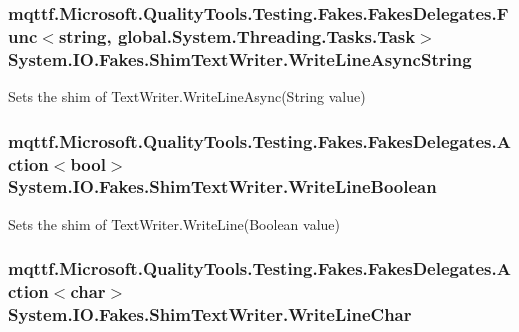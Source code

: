 \hypertarget{class_system_1_1_i_o_1_1_fakes_1_1_shim_text_writer_a182a57b6d52f8efeabd6879ccf35b156}{
\subsubsection[{Write\-Line\-Async\-String}]{\setlength{\rightskip}{0pt plus 5cm}mqttf.\-Microsoft.\-Quality\-Tools.\-Testing.\-Fakes.\-Fakes\-Delegates.\-Func$<$string, global.\-System.\-Threading.\-Tasks.\-Task$>$ System.\-I\-O.\-Fakes.\-Shim\-Text\-Writer.\-Write\-Line\-Async\-String\hspace{0.3cm}{\ttfamily [set]}}}\label{class_system_1_1_i_o_1_1_fakes_1_1_shim_text_writer_a182a57b6d52f8efeabd6879ccf35b156}


Sets the shim of Text\-Writer.\-Write\-Line\-Async(\-String value)

\hypertarget{class_system_1_1_i_o_1_1_fakes_1_1_shim_text_writer_a855a07d5ce542fc5f53ff4ec503994dc}{
\subsubsection[{Write\-Line\-Boolean}]{\setlength{\rightskip}{0pt plus 5cm}mqttf.\-Microsoft.\-Quality\-Tools.\-Testing.\-Fakes.\-Fakes\-Delegates.\-Action$<$bool$>$ System.\-I\-O.\-Fakes.\-Shim\-Text\-Writer.\-Write\-Line\-Boolean\hspace{0.3cm}{\ttfamily [set]}}}\label{class_system_1_1_i_o_1_1_fakes_1_1_shim_text_writer_a855a07d5ce542fc5f53ff4ec503994dc}


Sets the shim of Text\-Writer.\-Write\-Line(\-Boolean value)

\hypertarget{class_system_1_1_i_o_1_1_fakes_1_1_shim_text_writer_ad9ed651570fd5a0c597f557b41ef0378}{
\subsubsection[{Write\-Line\-Char}]{\setlength{\rightskip}{0pt plus 5cm}mqttf.\-Microsoft.\-Quality\-Tools.\-Testing.\-Fakes.\-Fakes\-Delegates.\-Action$<$char$>$ System.\-I\-O.\-Fakes.\-Shim\-Text\-Writer.\-Write\-Line\-Char\hspace{0.3cm}{\ttfamily [set]}}}\label{class_system_1_1_i_o_1_1_fakes_1_1_shim_text_writer_ad9ed651570fd5a0c597f557b41ef0378}


